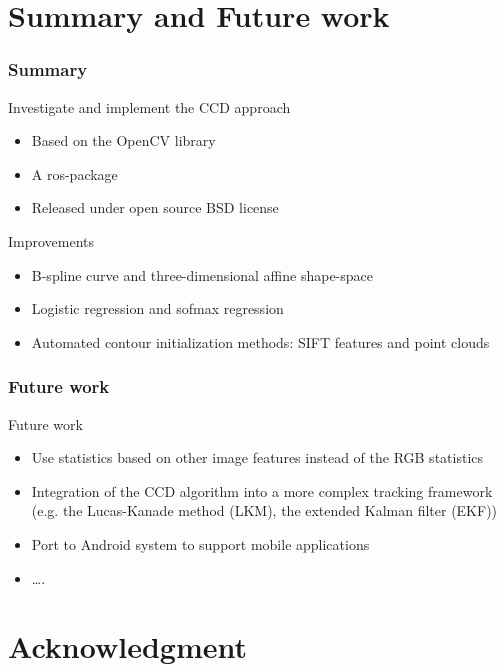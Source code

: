 \documentclass[english,10pt,presentation]{beamer}
\begin{document}
\section{Summary and Future work}
\label{sec-7}
\begin{frame}
\frametitle{Summary}
\label{sec-7_1}
\begin{block}{Investigate and implement the CCD approach}
\label{sec-7_1_1}
\begin{itemize}

\item Based on the OpenCV library\\
\label{sec-7_1_1_1}%
\item A ros-package\\
\label{sec-7_1_1_2}%
\item Released under open source BSD license\\
\label{sec-7_1_1_3}%
\end{itemize} %
\end{block}
\begin{block}{Improvements}
\label{sec-7_1_2}
\begin{itemize}

\item B-spline curve and three-dimensional affine shape-space\\
\label{sec-7_1_2_1}%
\item Logistic regression and sofmax regression\\
\label{sec-7_1_2_2}%
\item Automated contour initialization methods: SIFT features and point clouds\\
\label{sec-7_1_2_3}%
\end{itemize} %
\end{block}
\end{frame}
\begin{frame}
\frametitle{Future work}
\label{sec-7_2}
\begin{exampleblock}{Future work}
\label{sec-7_2_1}
\begin{itemize}

\item Use statistics based on other image features instead of the RGB statistics\\
\label{sec-7_2_1_1}%
\item Integration of the CCD algorithm into a more complex tracking framework (e.g. the Lucas-Kanade method (LKM), the extended Kalman  filter (EKF))\\
\label{sec-7_2_1_2}%
\item Port to Android system to support mobile applications\\
\label{sec-7_2_1_3}%
\item \ldots{}.\\
\label{sec-7_2_1_4}%
\end{itemize} %
\end{exampleblock}
\end{frame}
\section{Acknowledgment}
\label{sec-8}
\end{document}
